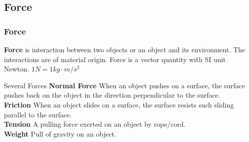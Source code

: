 \subsection{Force}
\begin{frame}
\frametitle{Force}
\begin{definition}
\textbf{\alert{Force}} is \alert{interaction} between two objects or an object and its environment. The interactions are of \alert{material} origin. Force is a \alert{vector} quantity with SI unit \alert{Newton}. $1\unit{N}=1\unit{kg\cdot m/s^2}$
\end{definition}
\begin{block}{Several Forces}
\textbf{\alert{Normal Force}} When an object \alert{pushes} on a surface, the surface pushes back on the object in the direction \alert{perpendicular} to the surface.\\
\textbf{\alert{Friction}} When an object \alert{slides} on a surface, the surface resists such sliding \alert{parallel} to the surface.\\
\textbf{\alert{Tension}} A \alert{pulling} force exerted on an object by rope/cord.\\
\textbf{\alert{Weight}} Pull of \alert{gravity} on an object.
\end{block}
\end{frame}
